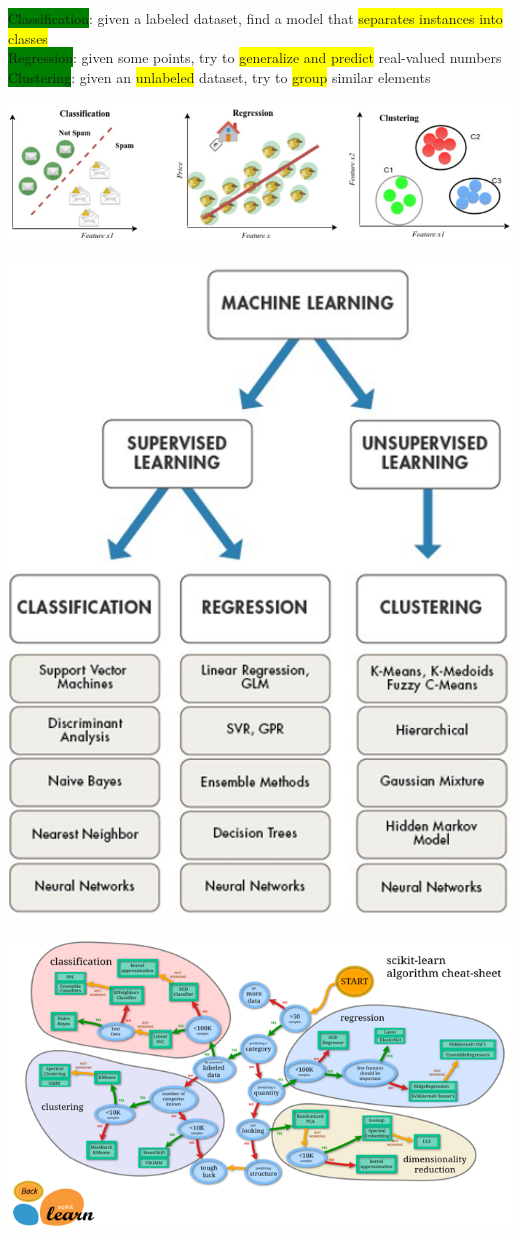 \documentclass[]{project_plan}
\begin{document}
\colorbox{green}{Classification}: given a labeled dataset, find a model that \colorbox{yellow}{separates instances into classes}\\
\colorbox{green}{Regression}: given some points, try to \colorbox{yellow}{generalize and predict} real-valued numbers\\
\colorbox{green}{Clustering}: given an \colorbox{yellow}{unlabeled} dataset, try to \colorbox{yellow}{group} similar elements

\includegraphics[width=.8\linewidth]{apps ml.png}

\includegraphics[width=.5\linewidth]{ml algos.png}

\includegraphics[width=.9\linewidth]{ml algo decision.png}
\end{document}
